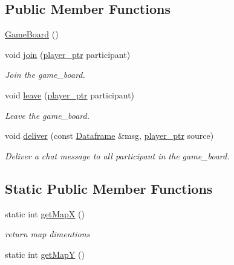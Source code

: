 \subsection*{Public Member Functions}
\begin{DoxyCompactItemize}
\item 
\hyperlink{classwebsocket_1_1GameBoard_a8093c83a31dd38e3edf1bc07de4b060a}{Game\+Board} ()
\item 
void \hyperlink{classwebsocket_1_1GameBoard_a3ca61a3da72869402a6e1702a99faa76}{join} (\hyperlink{namespacewebsocket_aec8d52893bdf524a1412533a63b006a3}{player\+\_\+ptr} participant)
\begin{DoxyCompactList}\small\item\em Join the game\+\_\+board. \end{DoxyCompactList}\item 
void \hyperlink{classwebsocket_1_1GameBoard_a2f3f0eb3fb2fbe6303426c1bc8d3fff7}{leave} (\hyperlink{namespacewebsocket_aec8d52893bdf524a1412533a63b006a3}{player\+\_\+ptr} participant)
\begin{DoxyCompactList}\small\item\em Leave the game\+\_\+board. \end{DoxyCompactList}\item 
void \hyperlink{classwebsocket_1_1GameBoard_a0ed4b13ba573956d8aebaf8f5c208fa0}{deliver} (const \hyperlink{structwebsocket_1_1Dataframe}{Dataframe} \&msg, \hyperlink{namespacewebsocket_aec8d52893bdf524a1412533a63b006a3}{player\+\_\+ptr} source)
\begin{DoxyCompactList}\small\item\em Deliver a chat message to all participant in the game\+\_\+board. \end{DoxyCompactList}\end{DoxyCompactItemize}
\subsection*{Static Public Member Functions}
\begin{DoxyCompactItemize}
\item 
static int \hyperlink{classwebsocket_1_1GameBoard_a3e8a7dec314f570a1d8cf92d4a711bd5}{get\+MapX} ()
\begin{DoxyCompactList}\small\item\em return map dimentions \end{DoxyCompactList}\item 
static int \hyperlink{classwebsocket_1_1GameBoard_a4f2dd5ab46f74a995388687dd6a5f440}{get\+MapY} ()
\end{DoxyCompactItemize}

